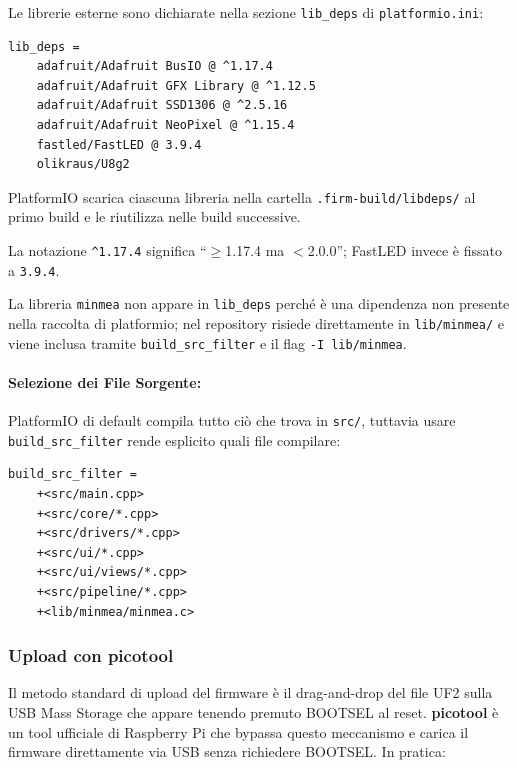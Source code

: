 Le librerie esterne sono dichiarate nella sezione \texttt{lib\_deps} di \texttt{platformio.ini}:

\begin{lstlisting}[style=ini, caption={platformio.ini --- dipendenze librerie}]
	lib_deps =
	adafruit/Adafruit BusIO @ ^1.17.4
	adafruit/Adafruit GFX Library @ ^1.12.5
	adafruit/Adafruit SSD1306 @ ^2.5.16
	adafruit/Adafruit NeoPixel @ ^1.15.4
	fastled/FastLED @ 3.9.4
	olikraus/U8g2
\end{lstlisting}

PlatformIO scarica ciascuna libreria nella cartella \texttt{.firm-build/libdeps/} al primo build e le riutilizza nelle build successive.

La notazione \texttt{\^{ }1.17.4} significa ``$\geq$1.17.4 ma $<$2.0.0''; FastLED invece è fissato a \texttt{3.9.4}.

La libreria \texttt{minmea} non appare in \texttt{lib\_deps} perché è una dipendenza non presente nella raccolta di platformio; nel repository risiede direttamente in \texttt{lib/minmea/} e viene inclusa tramite \texttt{build\_src\_filter} e il flag \texttt{-I lib/minmea}.

\paragraph{Selezione dei File Sorgente:}

PlatformIO di default compila tutto ciò che trova in \texttt{src/}, tuttavia usare \texttt{build\_src\_filter} rende esplicito quali file compilare:

\begin{lstlisting}[style=ini, caption={platformio.ini --- filtro sorgenti}]
	build_src_filter =
	+<src/main.cpp>
	+<src/core/*.cpp>
	+<src/drivers/*.cpp>
	+<src/ui/*.cpp>
	+<src/ui/views/*.cpp>
	+<src/pipeline/*.cpp>
	+<lib/minmea/minmea.c>
\end{lstlisting}

\subsubsection*{Upload con picotool}



Il metodo standard di upload del firmware è il drag-and-drop del file UF2 sulla USB Mass Storage che appare tenendo premuto BOOTSEL al reset. \textbf{picotool} è un tool ufficiale di Raspberry Pi che bypassa questo meccanismo e carica il firmware direttamente via USB senza richiedere BOOTSEL. In pratica:

